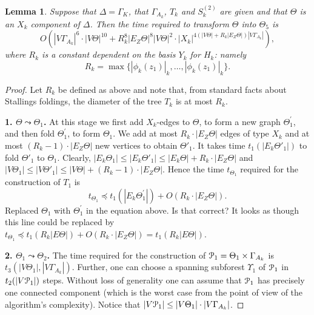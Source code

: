 \documentclass[a4paper,12pt]{article}
\newcommand{\G}{\Gamma }
\newcommand{\D}{\Delta }
\newcommand{\T}{\Theta }
\newcommand{\U}{\Upsilon }
\newcommand{\cP}{{\cal{P}}}
\newtheorem{lemma}[theorem]{Lemma}
\numberwithin{equation}{section}
\numberwithin{figure}{section}
\begin{document}
\begin{lemma}\label{lem:resolution} Suppose that $\D = \G_K$, 
that $\G_{A_k}$, 
$T_k$ and $S^{(2)}_k$ are given and that 
$\T$ is an $X_k$ component of $\D$. Then the time required to 
transform $\T$ into
$\T_5$ is  
\[O(|V \G_{A_k}|^6 \cdot
|V\T|^{10}+R_k^8|E_Z\T|^8|V\T|^2\cdot |X_k|^{4 (|V \T|+ R_k |E_Z
\T |)|V\G_{A_k}|}),\] 
where $R_k$ is a constant dependent on the basis $Y_k$
for $H_k$: namely 
\[R_k =  \max \{ |\phi_k(z_1)|_k, \ldots,
|\phi_k(z_1)|_k\}.\]
\end{lemma}

\begin{proof} Let $R_k$ be defined as above and note that, from 
standard facts about Stallings foldings,  the diameter
of the tree $T_k$ is at most $R_k$.

{\bf 1. $\T \leadsto \T_1$.} At this stage we first add $X_k$-edges to
$\T$, to form a new graph $\T^\prime_1$, and then fold $\T^\prime_1$, to 
form $\T_1$.   We add at most $R_k
\cdot |E_Z \T |$ edges of type $X_k$ and at most $(R_k-1)\cdot
|E_Z \T |$ new vertices to obtain $\T'_1$. It takes time 
$t_1(|E_k \T'_1|)$ to fold $\T'_1$ to  $\T_1$. Clearly,
$|E_k\T_1 | \le |E_k\T'_1 | \le |E_k\T | +  R_k \cdot |E_Z \T |$ and
$|V \T_1| \le |V \T'_1 | \le |V \T|+ (R_k-1)\cdot |E_Z \T |$. Hence the
time $t_{\T_1}$ required for the construction of $T_1$  is
\begin{equation}\label{theta1}
t_{\T_1} \preceq t_1(|E_k \T_1^\prime |) + O(R_k \cdot |E_Z \T |).
\end{equation}
{\ajd Replaced $\T_1$ with $\T_1^\prime$ in the equation above. Is that
correct? It looks as though
 this line could be replaced by
$t_{\T_1} \preceq t_1(R_k |E\T|) + O(R_k \cdot |E_Z \T |)
=t_1(R_k|E \T|)$.}

{\bf 2. $\T_1 \leadsto \T_2$.} The time required for the construction of 
$\cP_1=\T_1\times \G_{A_k}$ is $t_3(|V \T_1|,
|V \G_{A_k}|)$. Further, one can choose a spanning subforest
$\U_1$ of $\cP_1$ in  $t_2(|V\cP_1|)$ steps. Without loss
of generality one can assume that $\cP_1$ has precisely one
connected component (which is the worst case from the point of view
of the algorithm's
complexity). Notice that $|V\cP_1| \le |V\T_1|\cdot |V \G_{A_k}|$. 



\end{proof}
\end{document}
